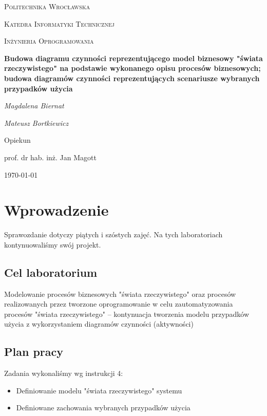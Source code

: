 \documentclass{article}
\begin{document}
	
	\begin{titlepage}
		\centering
		{\scshape\LARGE Politechnika Wrocławska \par}
		{\scshape\Large Katedra Informatyki Technicznej\par}
		
		\vspace{1cm}
		{\scshape\Large Inżynieria Oprogramowania\par}
		\vspace{1.5cm}
		{\huge\bfseries Budowa diagramu czynności reprezentującego model
			biznesowy "świata rzeczywistego" na podstawie
			wykonanego opisu procesów biznesowych; budowa
			diagramów czynności reprezentujących scenariusze
			wybranych przypadków użycia\par}
		\vspace{2cm}
		{\Large\itshape Magdalena Biernat\par}
		{\Large\itshape Mateusz Bortkiewicz\par}
		\vfill
		Opiekun\par
		prof. dr hab. inż. Jan Magott 
		
		\vfill
		{\large \today\par}
 	\end{titlepage}
	\newpage
	
	\section{Wprowadzenie}
	Sprawozdanie dotyczy piątych i szóstych zajęć. Na tych laboratoriach kontynuowaliśmy swój projekt. 
	
	\subsection{Cel laboratorium}
Modelowanie procesów biznesowych "świata rzeczywistego" oraz
procesów realizowanych przez tworzone oprogramowanie w celu
zautomatyzowania procesów "świata rzeczywistego" – kontynuacja
tworzenia modelu przypadków użycia z wykorzystaniem diagramów
czynności (aktywności)
	
	\subsection{Plan pracy}
	Zadania wykonaliśmy wg instrukcji 4:

	\begin{itemize}
		\item Definiowanie modelu "świata rzeczywistego" systemu
		\item Definiowane zachowania wybranych przypadków użycia
	\end{itemize}
\newpage
\end{document}
